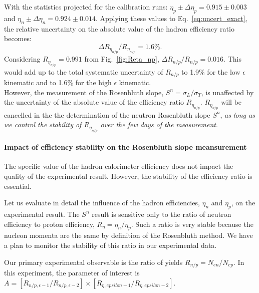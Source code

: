 With the statistics projected for the calibration runs: $\eta_p \pm \Delta\eta_{p} = 0.915 \pm 0.003$ and $\eta_n \pm \Delta\eta_{n} = 0.924 \pm 0.014$.
Applying these values to Eq.~\ref{eq:uncert_exact}, %
the relative uncertainty on the absolute value of the hadron efficiency ratio becomes:
%
\begin{equation}
  \Delta R_{\eta_{n/p}}/R_{\eta_{n/p}} = 1.6\%.
\end{equation}
%
Considering $R_{\eta_{n/p}} = 0.991$ from Fig.~\ref{fig:Reta_np}, $\Delta R_{n/p}/R_{n/p} = 0.016$. 
This would add up to the total systematic uncertainty of $R_{n/p}$ to 1.9\% for the low $\epsilon$ kinematic and to 1.6\% for the high $\epsilon$ kinematic.\\

However, %
the measurement of the Rosenbluth slope, $S^n = \sigma_L/\sigma_T$, is unaffected by the uncertainty of the absolute value of the efficiency ratio $R_{\eta_{n/p}}$.
$R_{\eta_{n/p}}$ will be cancelled in the the determination of the neutron Rosenbluth slope $S^n$, 
{\it as long as we control the stability of $R_{\eta_{n/p}}$ over the few days of the measurement}.

\paragraph{Impact of efficiency stability on the Rosenbluth slope meansurement}

The specific value of the hadron calorimeter efficiency does not impact the quality of the experimental result.
However, the stability of the efficiency ratio is essential.

Let us evaluate in detail the influence of the hadron efficiencies, $\eta_n$ and $\eta_p$, on the experimental result.
The $S^n$ result is sensitive only to the ratio of neutron efficiency to proton efficiency, $R_{\eta} = \eta_n/\eta_p$.
Such a ratio is very stable because the nucleon momenta are the same by definition of the Rosenbluth method.   
We have a plan to monitor the stability of this ratio in our experimental data.

Our primary experimental observable is the ratio of yields $R_{n/p} = N_{en}/N_{ep}$.
In this experiment, the parameter of interest is $A = [R_{n/p, \epsilon-1}/R_{n/p, \epsilon-2}]\times[R_{\eta, epsilon-1}/R_{\eta, epsilon-2}]$.

